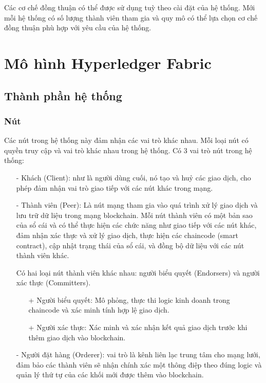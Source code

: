 Các cơ chế đồng thuận có thể được sử dụng tuỳ theo cài đặt của hệ thống. Mới mỗi hệ thống có 
số lượng thành viên tham gia và quy mô có thể lựa chọn cơ chế đồng thuận phù hợp với yêu cầu của hệ thống.

\section{Mô hình Hyperledger Fabric}
\subsection{Thành phần hệ thống}
\subsubsection{Nút}
Các nút trong hệ thống này đảm nhận các vai trò khác nhau. Mỗi loại nút có quyền truy cập và vai trò khác
nhau trong hệ thống.
Có 3 vai trò nút trong hệ thống:  
\begin{itemize}
    \item[-] Khách (Client): như là người dùng cuối, nó tạo và huỷ 
    các giao dịch, cho phép đảm nhận vai trò giao tiếp với các nút khác trong mạng.
    \item[-] Thành viên (Peer): Là nút mạng tham gia vào quá trình xử lý giao dịch và lưu trữ 
    dữ liệu trong mạng blockchain. Mỗi nút thành viên có một bản sao của sổ cái và có 
    thể thực hiện các chức năng như giao tiếp với các nút khác, đảm nhận xác thực và xử lý 
    giao dịch, thực hiện các chaincode (smart contract), cập nhật trạng thái của 
    sổ cái, và đồng bộ dữ liệu với các nút thành viên khác.
    
    Có hai loại nút thành viên khác nhau: người biểu quyết (Endorsers) và người xác thực (Committers).
        \begin{itemize}
            \item[+] Người biểu quyết: Mô phỏng, thực thi logic kinh doanh trong chaincode và xác minh tính hợp lệ giao dịch.
            \item[+] Người xác thực: Xác minh và xác nhận kết quả giao dịch trước khi thêm giao dịch vào blockchain. \cite{hyperledger1}
        \end{itemize}
    \item[-] Người đặt hàng (Orderer): vai trò là kênh liên lạc trung tâm cho mạng lưới, 
    đảm bảo các thành viên sẽ nhận chính 
    xác một thông điệp theo đúng logic và quản lý thứ tự của các 
    khối mới được thêm vào blockchain.
    
\end{itemize}
